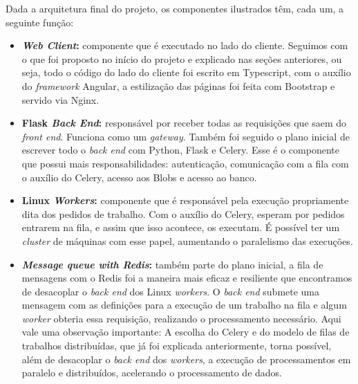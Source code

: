 \documentclass[11pt,twoside]{article}
\begin{document}
Dada a arquitetura final do projeto, os componentes ilustrados têm, cada um, a seguinte função:

\begin{itemize}
  \item \textbf{\emph{Web Client}:} componente que é executado no lado do cliente. Seguimos com o que foi proposto no início do projeto e explicado nas seções anteriores, ou seja, todo o código do lado do cliente 
  foi escrito em Typescript, com o auxílio do \emph{framework} Angular, a estilização das páginas foi feita com Bootstrap e servido via Nginx.
  \item \textbf{Flask \emph{Back End}:} responsável por receber todas as requisições que saem do \emph{front end}. Funciona como um \emph{gateway}. Também foi seguido o plano inicial de escrever todo o \emph{back end} com
  Python, Flask e Celery. Esse é o componente que possui mais responsabilidades: autenticação, comunicação com a fila com o auxílio do Celery, acesso aos Blobs e acesso ao banco.
  \item \textbf{Linux \emph{Workers}:} componente que é responsável pela execução propriamente dita dos pedidos de trabalho. Com o auxílio do Celery, esperam por pedidos entrarem na fila, e assim que isso acontece, os executam. 
  É possível ter um \emph{cluster} de máquinas com esse papel, aumentando o paralelismo das execuções.
  \item \textbf{\emph{Message queue with Redis}:} também parte do plano inicial, a fila de mensagens com o Redis foi a maneira mais eficaz e resiliente que encontramos de desacoplar o \emph{back end} dos Linux \emph{workers}.
  O \emph{back end} submete uma mensagem com as definições para a execução de um trabalho na fila e algum \emph{worker} obteria essa requisição, realizando o processamento necessário. Aqui vale uma observação 
  importante: A escolha do Celery e do modelo de filas de trabalhos distribuídas, que já foi explicada anteriormente, torna possível, além de desacoplar o \emph{back end} dos \emph{workers}, a execução de
  processamentos em paralelo e distribuídos, acelerando o processamento de dados.
  

\end{itemize}
\end{document}
